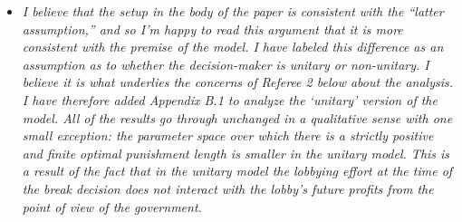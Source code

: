 \documentclass[12pt]{article}
\begin{document}
\begin{itemize}
\renewcommand\labelitemi{-}
	\item \textit{I believe that the setup in the body of the paper is consistent with the ``latter assumption,'' and so I'm happy to read this argument that it is more consistent with the premise of the model. I have labeled this difference as an assumption as to whether the decision-maker is unitary or non-unitary. I believe it is what underlies the concerns of Referee 2 below about the analysis. I have therefore added Appendix B.1 to analyze the `unitary' version of the model. All of the results go through unchanged in a qualitative sense with one small exception: the parameter space over which there is a strictly positive and finite optimal punishment length is smaller in the unitary model. This is a result of the fact that in the unitary model the lobbying effort at the time of the break decision does not interact with the lobby's future profits from the point of view of the government.}
\end{itemize}
\end{document}
